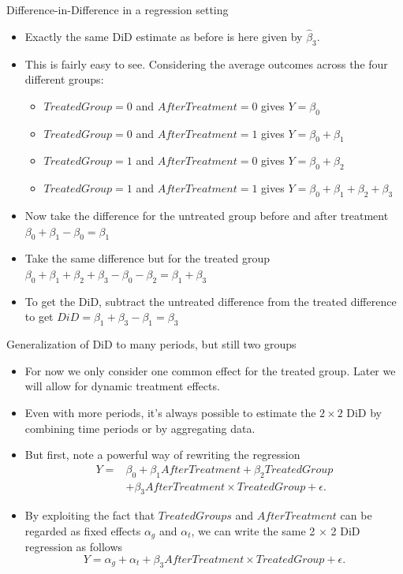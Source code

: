 \documentclass[notes,11pt, aspectratio=169]{beamer}
\begin{document}
\begin{frame}{Difference-in-Difference in a regression setting}
\begin{itemize}
\item Exactly the same DiD estimate as before is here given by $\hat{\beta}_3$.
\item This is fairly easy to see. Considering the average outcomes across the four different groups: 
    \begin{itemize}
    \item $TreatedGroup=0$ and $AfterTreatment=0$ gives $Y=\beta_0$ 
    \item $TreatedGroup=0$ and $AfterTreatment=1$ gives $Y=\beta_0 + \beta_1$ 
    \item $TreatedGroup=1$ and $AfterTreatment=0$ gives $Y=\beta_0 + \beta_2$ 
    \item $TreatedGroup=1$ and $AfterTreatment=1$ gives $Y=\beta_0+\beta_1+\beta_2+\beta_3$ 
    \end{itemize}
\item Now take the difference for the untreated group before and after treatment  $\beta_0 +\beta_1 -\beta_0 = \beta_1$
\item Take the same difference but for the treated group  $\beta_0 +\beta_1 +\beta_2 + \beta_3 - \beta_0 -\beta_2= \beta_1+\beta_3$
\item To get the DiD, subtract the untreated difference from the treated difference to get $DiD = \beta_1 + \beta_3 - \beta_1 = \beta_3$
\end{itemize}
\end{frame}

\begin{frame}{Generalization of DiD to many periods, but still two groups}
\begin{itemize}
\item For now we only consider one common effect for the treated group. Later we will allow for dynamic treatment effects.
\item Even with more periods, it's always possible to estimate the $2\times2$ DiD by combining time periods or by aggregating data. 
\item But first, note a powerful way of rewriting the regression
\begin{align}
Y = &\beta_0 + \beta_1 AfterTreatment + \beta_2 TreatedGroup\\ \nonumber
&+ \beta_3 AfterTreatment \times TreatedGroup + \epsilon.
\end{align}
\item By exploiting the fact that $TreatedGroups$ and $AfterTreatment$ can be regarded as fixed effects $\alpha_g$ and $\alpha_{t}$, we can write the same 2 × 2 DiD regression as follows 
\begin{equation}
Y = \alpha_g + \alpha_{t} + \beta_3 AfterTreatment \times TreatedGroup + \epsilon.
\end{equation}
\end{itemize}
\end{frame}
\end{document}
